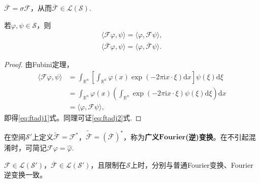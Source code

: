 \documentclass[../../main.tex]{subfiles}%
\begin{document}
\begin{proposition}
$\overline{\mathscr{F}}=\sigma\mathscr{F}$，从而$\overline{\mathscr{F}}\in\mathscr{L}(\mathscr{S})$.
\end{proposition}

\begin{proposition}
若$\varphi,\psi\in\mathscr{S}$，则
\begin{align}
\langle\mathscr{F}\varphi,\psi\rangle=\langle\varphi,\mathscr{F}\psi\rangle,\label{eq:ftadj1}\\
\langle\overline{\mathscr{F}}\varphi,\psi\rangle=\langle\varphi,\overline{\mathscr{F}}\psi\rangle.\label{eq:ftadj2}
\end{align}
\end{proposition}
\begin{proof}

由Fubini定理，
\begin{align*}
\langle\mathscr{F}\varphi,\psi\rangle&=\int_{\mathbb{R}^n}\left[\int_{\mathbb{R}^n}\varphi(x)\exp(-2\pi\mathrm{i}x\cdot\xi)\mathrm{d}x\right]\psi(\xi)\mathrm{d}\xi\\
&=\int_{\mathbb{R}^n}\varphi(x)\left(\int_{\mathbb{R}^n}\exp(-2\pi\mathrm{i}x\cdot\xi)\psi(\xi)\mathrm{d}\xi\right)\mathrm{d}x\\
&=\langle\varphi,\mathscr{F}\psi\rangle,
\end{align*}
即得\eqref{eq:ftadj1}式。同理可证\eqref{eq:ftadj2}式.

\end{proof}

\begin{definition}
在空间$\mathscr{S}'$上定义$\widetilde{\mathscr{F}}=\mathscr{F}^*$，$\widetilde{\overline{\mathscr{F}}}=(\overline{\mathscr{F}})^*$，称为\textbf{广义}$\mathbf{Fourier}$\textbf{(逆)变换}。在不引起混淆时，可简记$\mathscr{F}\varphi=\widehat{\varphi}$.
\end{definition}

\begin{proposition}
$\mathscr{F}\in\mathscr{L}(\mathscr{S}')$，$\overline{\mathscr{F}}\in\mathscr{L}(\mathscr{S}')$，且限制在$\mathscr{S}$上时，分别与普通Fourier变换、Fourier逆变换一致。
\end{proposition}
\end{document}
